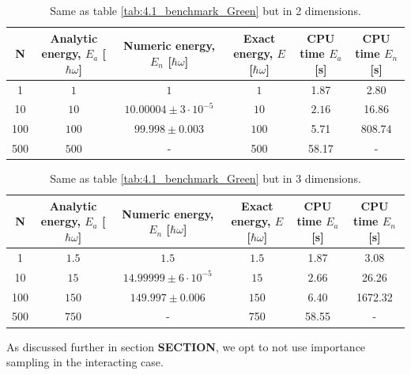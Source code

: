 \documentclass[a4paper, 10pt]{article}
\begin{document}
		 \begin{table}[ht!]
		 	\begin{adjustwidth}{-2cm}{}
		 		\begin{tabular}{cccccc}
		 			N & Analytic energy, $E_a$ [$\hbar \omega$] & Numeric energy, $E_n$ [$\hbar \omega$] & Exact energy, $E$ [$\hbar \omega$]& CPU time $E_a$ [s] &CPU time $E_n$ [s]\\
		 			\hline
		 			1&$1$&$1$&$1$& 1.87&2.80\\
		 			10&$10$&$10.00004\pm 3\cdot 10^{-5}$&$10$& $2.16$&16.86\\
		 			100&$100$&$99.998\pm 0.003$&$100$&5.71&808.74\\
		 			500&$500$&-&500 &58.17 &-
		 		\end{tabular}
		 	\end{adjustwidth}
		 	\caption{Same as table \ref{tab:4.1_benchmark_Green} but in 2 dimensions.}\label{tab:4.1_benchmark_Green_2D}
		 \end{table}
		 \begin{table}[ht!]
		 	\begin{adjustwidth}{-2cm}{}
		 		\begin{tabular}{cccccc}
		 			N & Analytic energy, $E_a$ [$\hbar \omega$] & Numeric energy, $E_n$ [$\hbar \omega$] & Exact energy, $E$ [$\hbar \omega$]& CPU time $E_a$ [s] &CPU time $E_n$ [s]\\
		 			\hline
		 			1&$1.5$&$1.5$&$1.5$& 1.87&3.08\\
		 			10&$15$&$14.99999\pm 6\cdot 10^{-5}$&$15$& $2.66$&26.26\\
		 			100&$150$&$149.997\pm 0.006$&$150$&6.40&1672.32\\
		 			500&$750$&-&750 &58.55 &-
		 		\end{tabular}
		 	\end{adjustwidth}
		 	\caption{Same as table \ref{tab:4.1_benchmark_Green} but in 3 dimensions.}\label{tab:4.1_benchmark_Green_3D}
		 \end{table}
	As discussed further in section \textbf{SECTION}, we opt to not use importance sampling in the interacting case.
\end{document}
